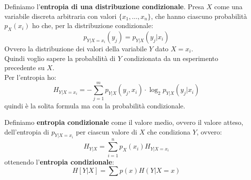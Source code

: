 \documentclass[a4paper,12pt, oneside]{book}
\begin{document}
\begin{definizione}
  Definiamo l'\textbf{entropia di una distribuzione condizionale}. Presa $X$
  come una variabile discreta arbitraria con valori $\{x_1,\ldots,x_n\}$, che
  hanno ciascuno probabilità $p_X(x_i)$ ho che, per la distribuzione
  condizionale:
  \[p_{Y|X=x_i}(y_j)=p_{Y|X}(y_j|x_i)\]
  Ovvero la distribuzione dei valori della variabile $Y$ dato $X=x_i$.\\
  Quindi voglio sapere la probabilità di $Y$ condizionata da un esperimento
  precedente su $X$.\\
  Per l'entropia ho:
  \[H_{Y|X=x_i}=-\sum_{j=1}^m p_{Y|X}(y_j,x_i)\cdot \log_2 p_{Y|X}(y_j|x_i)\]
  quindi è la solita formula ma con la probabilità condizionale.
\end{definizione}
\begin{definizione}
  Definiamo \textbf{entropia condizionale} come il valore medio, ovvero il
  valore atteso, dell'entropia di $p_{Y|X=x_i}$ per ciascun valore di $X$ che
  condiziona $Y$, ovvero:
  \[H_{Y|X}=\sum_{i=1}^n p_X(x_i)H_{Y|X=x_i}\]
  ottenendo l'\textbf{entropia condizionale}:
  \[H[Y|X]=\sum p(x)H(Y|X=x)\]
\end{definizione}
\end{document}
